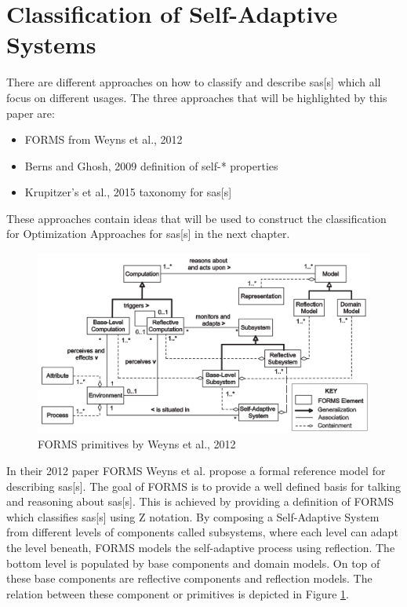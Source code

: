 \section{Classification of Self-Adaptive Systems}
\label{ch:SASClassification}

There are different approaches on how to classify and describe \acrlong{sas}[s] which all focus on different usages.
The three approaches that will be highlighted by this paper are:
\begin{itemize}[nosep]
    \item FORMS from Weyns et al., 2012 \cite*{FORMS}
    \item Berns and Ghosh, 2009 definition of self-* properties \cite*{DissectingSelfProperties}
    \item Krupitzer's et al., 2015 taxonomy for \acrlong{sas}[s] \cite*{SurveyOnEngineeringApproaches}
\end{itemize} 
These approaches contain ideas that will be used to construct the classification for
Optimization Approaches for \acrlong{sas}[s] in the next chapter.

\begin{figure}[b!]
    \centering
    \includegraphics[width=\textwidth]{images/FORMS.png}
    \caption{FORMS primitives by Weyns et al., 2012 \cite*{FORMS}}
    \label{fig:FORMS}
\end{figure}
\noindent In their 2012 paper FORMS \cite{FORMS} Weyns et al. propose a formal reference model for describing \acrlong{sas}[s].
The goal of FORMS is to provide a well defined basis for talking and reasoning about \acrlong{sas}[s].
This is achieved by providing a definition of FORMS which classifies \acrlong{sas}[s] using Z notation.
By composing a Self-Adaptive System from different levels of components called subsystems,
where each level can adapt the level beneath, FORMS models the self-adaptive process using reflection.
The bottom level is populated by base components and domain models.
On top of these base components are reflective components and reflection models.
The relation between these component or primitives is depicted in Figure \ref{fig:FORMS}.

